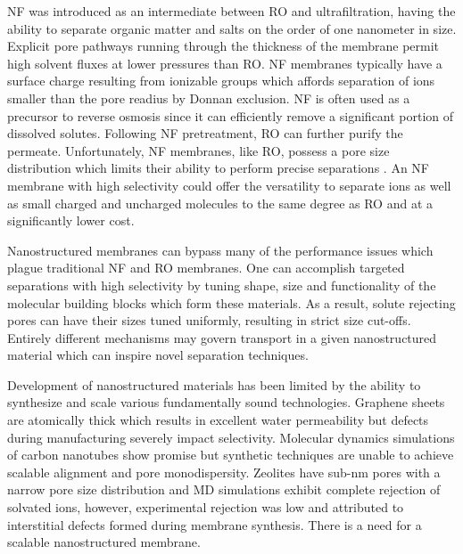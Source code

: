 \documentclass{article}
\begin{document}
  NF was introduced as an intermediate between RO and ultrafiltration, having
  the ability to separate organic matter and salts on the order of one nanometer
  in size. Explicit pore pathways running through the thickness of the membrane
  permit high solvent fluxes at lower pressures than RO. NF membranes typically
  have a surface charge resulting from ionizable groups which affords separation
  of ions smaller than the pore readius by Donnan exclusion.
  \cite{van_der_bruggen_review_2003} NF is often used as a precursor to reverse
  osmosis since it can efficiently remove a significant portion of dissolved
  solutes. Following NF pretreatment, RO can further purify the permeate. 
  Unfortunately, NF membranes, like RO, possess a pore size
  distribution which limits their ability to perform precise separations
  \cite{bowen_modelling_2002}. An NF membrane with high selectivity could offer
  the versatility to separate ions as well as small charged and uncharged
  molecules to the same degree as RO and at a significantly lower cost.

  Nanostructured membranes can bypass many of the performance issues which
  plague traditional NF and RO membranes. One can accomplish targeted separations
  with high selectivity by tuning shape, size and functionality of the molecular
  building blocks which form these materials. As a result, solute rejecting pores
  can have their sizes tuned uniformly, resulting in strict size cut-offs.
  Entirely different mechanisms may govern transport in a given nanostructured
  material which can inspire novel separation techniques.

  Development of nanostructured materials has been limited by the ability to
  synthesize and scale various fundamentally sound technologies.  Graphene sheets
  are atomically thick which results in excellent water permeability but defects
  during manufacturing severely impact selectivity.
  \cite{cohen-tanugi_multilayer_2016} Molecular dynamics simulations of carbon
  nanotubes show promise \cite{humplik_nanostructured_2011} but synthetic
  techniques are unable to achieve scalable alignment and pore monodispersity.
  \cite{hata_water-assisted_2004,maruyama_growth_2005} Zeolites have sub-nm pores
  with a narrow pore size distribution and MD simulations exhibit complete
  rejection of solvated ions, \cite{murad_molecular_1998} however, experimental
  rejection was low and attributed to interstitial defects formed during membrane
  synthesis. \cite{li_desalination_2004} There is a need for a scalable
  nanostructured membrane. 
\end{document}

